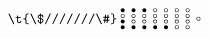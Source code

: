 \begin{equation}\label{eq:bitmap}
\renewcommand{\arraystretch}{0.1}
    \t{\$///////\#}\begin{array}{@{}c@{}}
    \text\textbullet\\
    \text\textopenbullet\\
    \text\textbullet\\
    \text\textbullet
    \end{array}
    \begin{array}{@{}c@{}}
    \text\textbullet\\
    \text\textopenbullet\\
    \text\textopenbullet\\
    \text\textbullet
    \end{array}
    \begin{array}{@{}c@{}}
    \text\textbullet\\
    \text\textopenbullet\\
    \text\textopenbullet\\
    \text\textbullet
    \end{array}
    \begin{array}{@{}c@{}}
    \text\textopenbullet\\
    \text\textopenbullet\\
    \text\textopenbullet\\
    \text\textbullet
    \end{array}
    \begin{array}{@{}c@{}}
    \text\textopenbullet\\
    \text\textopenbullet\\
    \text\textopenbullet\\
    \text\textbullet
    \end{array}
    \begin{array}{@{}c@{}}
    \text\textopenbullet\\
    \text\textopenbullet\\
    \text\textopenbullet\\
    \text\textopenbullet
    \end{array}
    \begin{array}{@{}c@{}}
    \text\textopenbullet\\
    \text\textopenbullet\\
    \text\textopenbullet\\
    \text\textopenbullet
    \end{array}
    \begin{array}{@{}c@{}}
    \text\textopenbullet\\

\end{array}
\end{equation}
